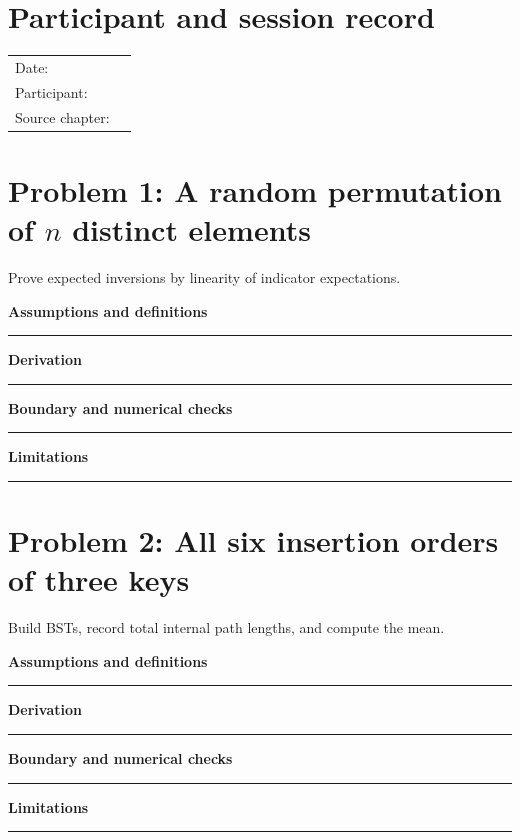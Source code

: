 \documentclass[11pt]{article}
\begin{document}
\makedoctitle
\section{Participant and session record}
\begin{tabularx}{\linewidth}{@{}lX@{}}Date: & \hrulefill\\ Participant: & \hrulefill\\ Source chapter: & \hrulefill\\\end{tabularx}
\section{\texorpdfstring{Problem 1: A random permutation of $n$ distinct elements}{Problem 1: A random permutation of n distinct elements}}
Prove expected inversions by linearity of indicator expectations.\par\medskip
\textbf{Assumptions and definitions}\par\vspace{0.7cm}\hrule\vspace{0.35cm}
\textbf{Derivation}\par\vspace{2.1cm}\hrule\vspace{0.3cm}
\textbf{Boundary and numerical checks}\par\vspace{1.1cm}\hrule\vspace{0.35cm}
\textbf{Limitations}\par\vspace{0.9cm}\hrule\vspace{0.35cm}
\section{Problem 2: All six insertion orders of three keys}
Build BSTs, record total internal path lengths, and compute the mean.\par\medskip
\textbf{Assumptions and definitions}\par\vspace{0.7cm}\hrule\vspace{0.35cm}
\textbf{Derivation}\par\vspace{2.1cm}\hrule\vspace{0.3cm}
\textbf{Boundary and numerical checks}\par\vspace{1.1cm}\hrule\vspace{0.35cm}
\textbf{Limitations}\par\vspace{0.9cm}\hrule\vspace{0.35cm}
\end{document}
